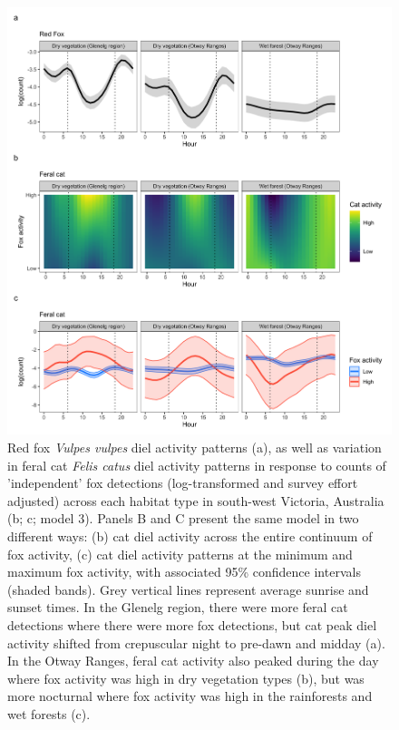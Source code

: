\documentclass[11pt,a4paper,titlepage,twoside,openright]{style/unimelbthesis}
\begin{document}
\begin{mainmatter}
\begin{figure}
{\centering \includegraphics[width=1\linewidth]{figure/cat_fox_count} 

}

\caption{Red fox \textit{Vulpes vulpes} diel activity patterns (a), as well as variation in feral cat \textit{Felis catus} diel activity patterns in response to counts of ’independent’ fox detections (log-transformed and survey effort adjusted) across each habitat type in south-west Victoria, Australia (b; c; model 3). Panels B and C present the same model in two different ways: (b) cat diel activity across the entire continuum of fox activity, (c) cat diel activity patterns at the minimum and maximum fox activity, with associated 95\% confidence intervals (shaded bands). Grey vertical lines represent average sunrise and sunset times. In the Glenelg region, there were more feral cat detections where there were more fox detections, but cat peak diel activity shifted from crepuscular night to pre-dawn and midday (a). In the Otway Ranges, feral cat activity also peaked during the day where fox activity was high in dry vegetation types (b), but was more nocturnal where fox activity was high in the rainforests and wet forests (c).}\label{fig:diel-cat-fox}
\end{figure}
\newpage


\end{mainmatter}
\end{document}
